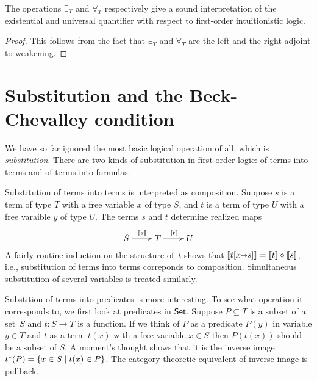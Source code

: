 \begin{proposition}
  The operations $\exists_{T}$ and $\forall_{T}$
  respectively give a sound interpretation of the existential and
  universal quantifier with respect to first-order intuitionistic
  logic.
\end{proposition}

\begin{proof}
  This follows from the fact that $\exists_{T}$ and
  $\forall_{T}$ are the left and the right adjoint to weakening.
\end{proof}

\section{Substitution and the Beck-Chevalley condition}
\label{sec:beck-chevalley}

We have so far ignored the most basic logical operation of all, which
is \emph{substitution}. There are two kinds of substitution in
first-order logic: of terms into terms and of terms into formulas.

Substitution of terms into terms is interpreted as composition.
Suppose $s$ is a term of type $T$ with a free variable $x$ of
type $S$, and $t$ is a term of type $U$ with a free
varaible $y$ of type $U$. The terms $s$ and $t$ determine
realized maps
%
\begin{equation*}
  \xymatrix{
    {S}
    \ar[r]^{\sem{s}}
    &
    {T}
    \ar[r]^{\sem{t}}
    &
    {U}
  }
\end{equation*}
%
A fairly routine induction on the structure of~$t$ shows that
$[\![t[x {\shortrightarrow} s]]\!] = [\![t]\!] \circ [\![s]\!]$, i.e.,
substitution of terms into terms correponds to composition.
Simultaneous substitution of several variables is treated similarly.

Substition of terms into predicates is more interesting. To see what
operation it corresponds to, we first look at predicates in $\mathsf{Set}$.
Suppose $P \subseteq T$ is a subset of a set~$S$ and $t : S \to T$ is
a function. If we think of $P$ as a predicate $P(y)$ in variable $y
\in T$ and $t$ as a term $t(x)$ with a free variable $x \in S$ then
$P(t(x))$ should be a subset of $S$. A moment's thought shows that it
is the inverse image $t^{*}(P) = \{x \in S \mid t(x) \in P\}$.
The category-theoretic equivalent of inverse image is pullback.

